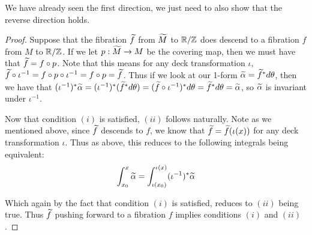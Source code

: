 We have already seen the first direction, we just need to also show that the reverse direction holds.

\begin{proof}
Suppose that the fibration $\widetilde{f}$ from $\widetilde{M}$ to $\mathbb{R}/\mathbb{Z}$ does descend to a fibration $f$ from $M$ to $\mathbb{R}/\mathbb{Z}$. If we let $p: \widetilde{M} \xrightarrow[]{} M$ be the covering map, then we must have that $\widetilde{f} = f \circ p$. Note that this means for any deck transformation $\iota$, $\widetilde{f} \circ \iota^{-1} = f \circ p \circ \iota^{-1} = f \circ p = \widetilde{f}$. Thus if we look at our 1-form $\widetilde{\alpha} = \widetilde{f}^*d\theta$, then we have that $(\iota^{-1})^*\widetilde{\alpha} = (\iota^{-1})^*(\widetilde{f}^*d\theta) = (\widetilde{f} \circ \iota^{-1})^*d\theta = \widetilde{f}^*d\theta = \widetilde{\alpha}$, so $\widetilde{\alpha}$ is invariant under $\iota^{-1}$.

Now that condition $(i)$ is satisfied, $(ii)$ follows naturally. Note as we mentioned above, since $\widetilde{f}$ descends to $f$, we know that $\widetilde{f} = \widetilde{f}(\iota(x))$ for any deck transformation $\iota$. Thus as above, this reduces to the following integrals being equivalent:
\begin{align*}
  \int_{x_0}^x \widetilde{\alpha} = \int_{\iota(x_0)}^{\iota(x)} (\iota^{-1})^{\ast} \widetilde{\alpha}
\end{align*}

Which again by the fact that condition $(i)$ is satisfied, reduces to $(ii)$ being true. Thus $\widetilde{f}$ pushing forward to a fibration $f$ implies conditions $(i)$ and $(ii)$.

\end{proof}